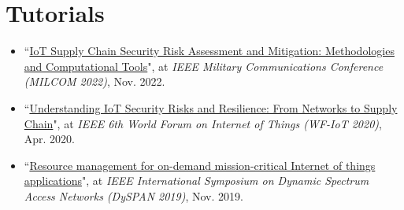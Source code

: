 \documentclass[letterpaper,11pt]{article}
\newcommand{\resumeSubHeadingListStart}{\begin{itemize}[leftmargin=*]}
\newcommand{\resumeSubHeadingListEnd}{\end{itemize}}
\begin{document}
\section{Tutorials}
 \resumeSubHeadingListStart
 \justifying
      \item[\text{[T1]}] ``\href{https://milcom2022.milcom.org/program/tutorials#tut-04}{IoT Supply Chain Security Risk Assessment and Mitigation: Methodologies and Computational Tools}", at \textit{IEEE Military Communications Conference (MILCOM 2022)}, Nov. 2022.
      \item[\text{[T2]}] ``\href{https://wfiot2020.iot.ieee.org/program/technical-program/tutorials/}{Understanding IoT Security Risks and Resilience: From Networks to Supply Chain}", at \textit{IEEE 6th World Forum on Internet of Things (WF-IoT 2020)}, Apr. 2020.
      \item[\text{[T3]}] ``\href{https://dyspan2019.ieee-dyspan.org/tutorial-resource-management-demand-mission-critical-internet-things-applications}{Resource management for on-demand mission-critical Internet of things applications}", at \textit{IEEE International Symposium on Dynamic Spectrum Access Networks (DySPAN 2019)}, Nov. 2019.
  \resumeSubHeadingListEnd
\end{document}
